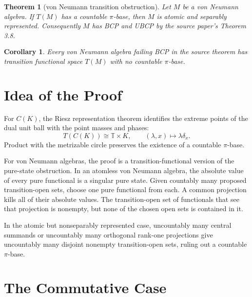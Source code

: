 \documentclass[11pt]{article}
\newtheorem{theorem}{Theorem}
\newtheorem{corollary}{Corollary}
\newcommand{\T}{\mathbb T}
\begin{document}
\begin{theorem}[von Neumann transition obstruction]
\label{thm:vn}
Let \(M\) be a von Neumann algebra.  If \(T(M)\) has a countable
\(\pi\)-base, then \(M\) is atomic and separably represented.  Consequently
\(M\) has BCP and UBCP by the source paper's Theorem 3.8.
\end{theorem}

\begin{corollary}
\label{cor:negative}
Every von Neumann algebra failing BCP in the source theorem has transition
functional space \(T(M)\) with no countable \(\pi\)-base.
\end{corollary}

\section*{Idea of the Proof}

For \(C(K)\), the Riesz representation theorem identifies the extreme points
of the dual unit ball with the point masses and phases:
\[
        T(C(K))\cong \T\times K,\qquad
        (\lambda,x)\mapsto \lambda\delta_x .
\]
Product with the metrizable circle preserves the existence of a countable
\(\pi\)-base.

For von Neumann algebras, the proof is a transition-functional version of the
pure-state obstruction.  In an atomless von Neumann algebra, the absolute
value of every pure functional is a singular pure state.  Given countably
many proposed transition-open sets, choose one pure functional from each.
A common projection kills all of their absolute values.  The transition-open
set of functionals that see that projection is nonempty, but none of the
chosen open sets is contained in it.

In the atomic but nonseparably represented case, uncountably many central
summands or uncountably many orthogonal rank-one projections give
uncountably many disjoint nonempty transition-open sets, ruling out a
countable \(\pi\)-base.

\section*{The Commutative Case}
\end{document}
